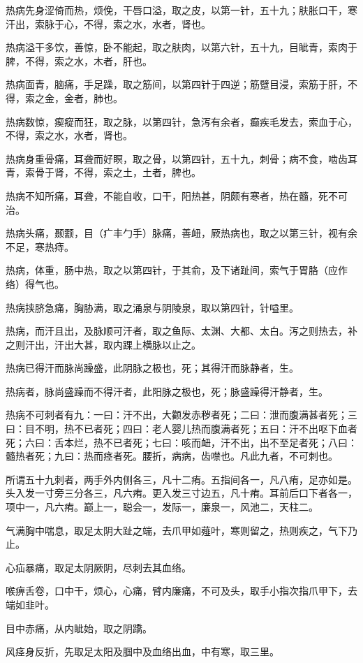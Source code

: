 \documentclass[a4paper,12pt,UTF8,twoside]{ctexbook}
\begin{document}
	热病先身涩倚而热，烦俛，干唇口溢，取之皮，以第一针，五十九；肤胀口干，寒汗出，索脉于心，不得，索之水，水者，肾也。
	
	热病溢干多饮，善惊，卧不能起，取之肤肉，以第六针，五十九，目眦青，索肉于脾，不得，索之水，木者，肝也。
	
	热病面青，脑痛，手足躁，取之筋间，以第四针于四逆；筋躄目浸，索筋于肝，不得，索之金，金者，肺也。
	
	热病数惊，瘈瘲而狂，取之脉，以第四针，急泻有余者，癫疾毛发去，索血于心，不得，索之水，水者，肾也。
	
	热病身重骨痛，耳聋而好瞑，取之骨，以第四针，五十九，刺骨；病不食，啮齿耳青，索骨于肾，不得，索之土，土者，脾也。
	
	热病不知所痛，耳聋，不能自收，口干，阳热甚，阴颇有寒者，热在髓，死不可治。
	
	热病头痛，颞颥，目（疒丰勹手）脉痛，善衄，厥热病也，取之以第三针，视有余不足，寒热痔。
	
	热病，体重，肠中热，取之以第四针，于其俞，及下诸趾间，索气于胃胳（应作络）得气也。
	
	热病挟脐急痛，胸胁满，取之涌泉与阴陵泉，取以第四针，针嗌里。
	
	热病，而汗且出，及脉顺可汗者，取之鱼际、太渊、大都、太白。泻之则热去，补之则汗出，汗出大甚，取内踝上横脉以止之。
	
	热病已得汗而脉尚躁盛，此阴脉之极也，死；其得汗而脉静者，生。
	
	热病者，脉尚盛躁而不得汗者，此阳脉之极也，死；脉盛躁得汗静者，生。
	
	热病不可刺者有九：一曰：汗不出，大颧发赤秽者死；二曰：泄而腹满甚者死；三曰：目不明，热不已者死；四曰：老人婴儿热而腹满者死；五曰：汗不出呕下血者死；六曰：舌本烂，热不已者死；七曰：咳而衄，汗不出，出不至足者死；八曰：髓热者死；九曰：热而痉者死。腰折，病病，齿噤也。凡此九者，不可刺也。
	
	所谓五十九刺者，两手外内侧各三，凡十二痏。五指间各一，凡八痏，足亦如是。头入发一寸旁三分各三，凡六痏。更入发三寸边五，凡十痏。耳前后口下者各一，项中一，凡六痏。巅上一，聪会一，发际一，廉泉一，风池二，天柱二。
	
	气满胸中喘息，取足太阴大趾之端，去爪甲如薤叶，寒则留之，热则疾之，气下乃止。
	
	心疝暴痛，取足太阴厥阴，尽刺去其血络。
	
	喉痹舌卷，口中干，烦心，心痛，臂内廉痛，不可及头，取手小指次指爪甲下，去端如韭叶。
	
	目中赤痛，从内眦始，取之阴蹻。
	
	风痉身反折，先取足太阳及腘中及血络出血，中有寒，取三里。
	
\end{document}
